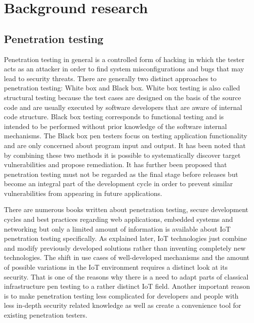 \section{Background research}

\subsection{Penetration testing}
Penetration testing in general is a controlled form of hacking in which the tester acts as an attacker in order to find system misconfigurations and bugs that may lead to security threats\cite{usd}. There are generally two distinct approaches to penetration testing: White box and Black box. White box testing is also called structural testing because the test cases are designed on the basis of the source code and are usually executed by software developers that are aware of internal code structure. Black box testing corresponds to functional testing and is intended to be performed without prior knowledge of the software internal mechanisms. The Black box pen testers focus on testing application functionality and are only concerned about program input and output\cite{nidhra}. It has been noted that by combining these two methods it is possible to systematically discover target vulnerabilities and propose remediation\cite{7452095}. It has further been proposed that penetration testing must not be regarded as the final stage before releases but become an integral part of the development cycle in order to prevent similar vulnerabilities from appearing in future applications\cite{1392709}. 

There are numerous books written about penetration testing\cite{pentestbook}, secure development cycles and best practices regarding web applications, embedded systems and networking but only a limited amount of information is available about IoT penetration testing specifically\cite{cookbook}. As explained later, IoT technologies just combine and modify previously developed solutions rather than inventing completely new technologies. The shift in use cases of well-developed mechanisms and the amount of possible variations in the IoT environment requires a distinct look at its security. That is one of the reasons why there is a need to adapt parts of classical infrastructure pen testing to a rather distinct IoT field. Another important reason is to make penetration testing less complicated for developers and people with less in-depth security related knowledge as well as create a convenience tool for existing penetration testers.

